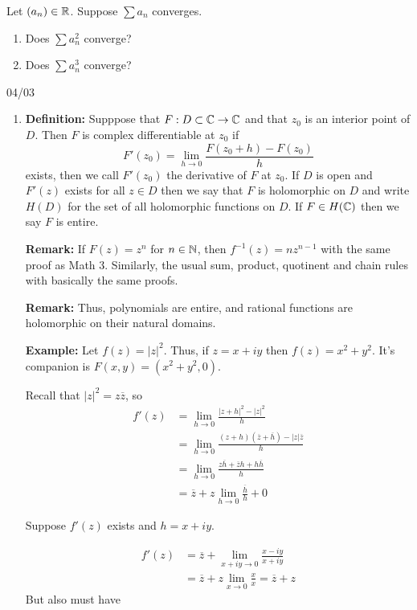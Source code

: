 \documentclass[12pt]{article}
\begin{document}
\begin{problem}{}
    Let $(a_n) \in \mathbb R$. 
    Suppose $\sum a_n$ converges.
    \begin{enumerate}
        \item Does $\sum a^2_n$ converge? 
        \item Does $\sum a^3_n$ converge? 
    \end{enumerate}
\end{problem}


\newpage 

04/03 

\begin{enumerate}
    \item \textbf{Definition:} Supppose that $F: D \subset \mathbb C \to \mathbb C$ and that $z_0$ is an interior point of $D$. Then $F$ is complex differentiable at $z_0$ if 
    \[F'(z_0) = \lim_{h\to 0} \frac{F(z_0+h) - F(z_0)}{h}\]
    exists, then we call $F'(z_0)$ the derivative of $F$ at $z_0$. If $D$ is open and $F'(z)$ exists for all $z \in D$ then we say that $F$ is holomorphic on $D$ and write $H(D)$ for the set of all holomorphic functions on $D$. If $F \in H(\mathbb C)$ then we say $F$ is entire. 

    \textbf{Remark:} If $F(z) = z^n$ for $n \in \mathbb N$, then $f^{-1}(z) = n z^{n-1}$ with the same proof as Math 3. Similarly, the usual sum, product, quotinent and chain rules with basically the same proofs. 

    \textbf{Remark:} Thus, polynomials are entire, and rational functions are holomorphic on their natural domains. 

    \textbf{Example:} Let $f(z) = |z|^2$. Thus, if $z = x + iy$ then $f(z) =  x^2 + y^2$. It's companion is $F(x,y) = (x^2 + y^2, 0)$. 
    
    Recall that $|z|^2 = z \overline{z}$, so 
    \begin{align*}
        f'(z) &= \lim_{ h \to 0 } \frac{|z + h| ^2 - |z|^2}{h} \\ 
        &= \lim_{ h \to 0 } \frac{(z+h)(\overline z + \overline h) - |z|\overline z}{h} \\ 
        &= \lim_{ h \to 0 } \frac{z\overline h + \overline z h + h \overline h}{h} \\ 
        &= \overline z + z \lim_{h\to 0} \frac{\overline h}{h} + 0 
    \end{align*}

    Suppose $f'(z)$ exists and $h = x +iy$. 

    \begin{align*}
        f'(z) &= \overline z + \lim_{x + iy \to 0} \frac{x - iy}{x + iy}  \\ 
        &= \overline z + z \lim_{x \to 0} \frac{x}{x} = \overline z + z 
    \end{align*}
    But also must have 


\end{enumerate}
\end{document}
